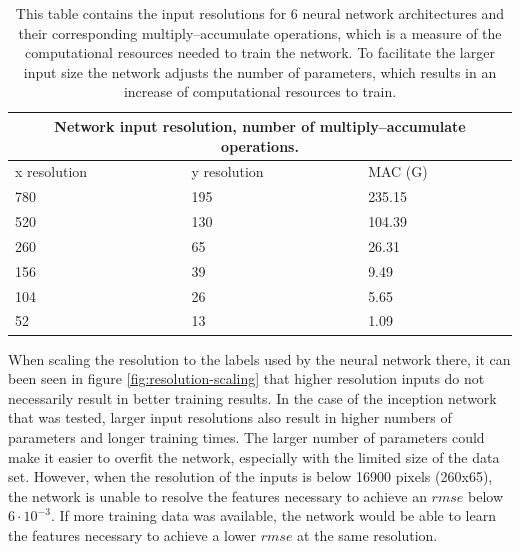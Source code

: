 \begin{table}
    \begin{tabular}{ |p{3cm}|p{3cm}|p{4cm}|  }
        \hline
        \multicolumn{3}{|c|}{Network input resolution, number of multiply–accumulate operations.} \\
        \hline
        x resolution & y resolution & MAC (G)                                                     \\
        \hline
        780          & 195          & 235.15                                                      \\
        520          & 130          & 104.39                                                      \\
        260          & 65           & 26.31                                                       \\
        156          & 39           & 9.49                                                        \\
        104          & 26           & 5.65                                                        \\
        52           & 13           & 1.09                                                        \\
        \hline
    \end{tabular}
    \caption{This table contains the input resolutions for 6 neural network architectures and their corresponding multiply–accumulate operations, which is a measure of the computational resources needed to train the network. To facilitate the larger input size the network adjusts the number of parameters, which results in an increase of computational resources to train.}
    \label{table:input}
\end{table}

When scaling the resolution to the labels used by the neural network there, it can been seen in figure \ref{fig:resolution-scaling} that higher resolution inputs do not necessarily result in better training results. In the case of the inception network that was tested, larger input resolutions also result in higher numbers of parameters and longer training times. The larger number of parameters could make it easier to overfit the network, especially with the limited size of the data set. However, when the resolution of the inputs is below 16900 pixels (260x65), the network is unable to resolve the features necessary to achieve an $rmse$ below $6 \cdot 10^{-3}$. If more training data was available, the network would be able to learn the features necessary to achieve a lower $rmse$ at the same resolution.

